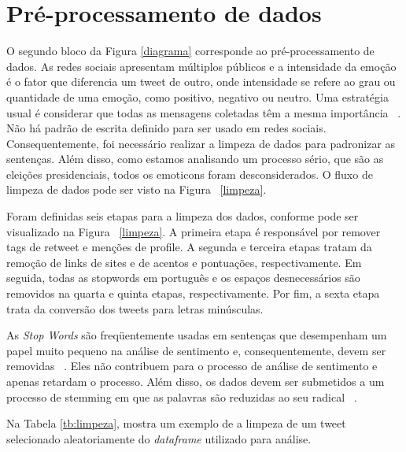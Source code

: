 %


\section{Pré-processamento de dados}
\label{sec:limpeza}

O segundo bloco da Figura \ref{diagrama} corresponde ao pré-processamento
de dados. As redes sociais apresentam múltiplos
públicos e a intensidade da emoção é o fator que diferencia um tweet de outro, onde intensidade se refere ao
grau ou quantidade de uma emoção, como positivo, negativo ou neutro.
Uma estratégia usual é considerar que todas as mensagens
coletadas têm a mesma importância ~\cite{de2015estrategia}.
Não há padrão de escrita definido para ser usado em redes
sociais. Consequentemente, foi necessário realizar a limpeza
de dados para padronizar as sentenças. Além disso, como estamos analisando um processo sério, que são as eleições presidenciais, todos os emoticons foram desconsiderados. O fluxo de limpeza de dados pode
ser visto na Figura ~\ref{limpeza}.




Foram definidas seis etapas para a limpeza dos dados, conforme pode ser visualizado na Figura ~\ref{limpeza}. 
A primeira etapa é responsável por remover tags de retweet e menções de profile. 
A segunda e terceira etapas tratam da remoção de links de sites e de acentos e pontuações, respectivamente.
 Em seguida, todas as stopwords em português e os espaços desnecessários são removidos na quarta e quinta etapas, respectivamente. 
 Por fim, a sexta etapa trata da conversão dos tweets para letras minúsculas.


As \textit{Stop Words} são freqüentemente usadas em sentenças
que desempenham um papel muito pequeno na análise de sentimento e, consequentemente, devem ser removidas ~\cite{sharma}.
Eles não contribuem para o processo de análise de sentimento
e apenas retardam o processo. Além disso, os dados devem ser
submetidos a um processo de stemming em que as palavras
são reduzidas ao seu radical ~\cite{de2015estrategia}.

    Na Tabela \ref{tb:limpeza}, mostra um exemplo de a limpeza de um tweet selecionado aleatoriamente do \textit{dataframe} utilizado para análise.


